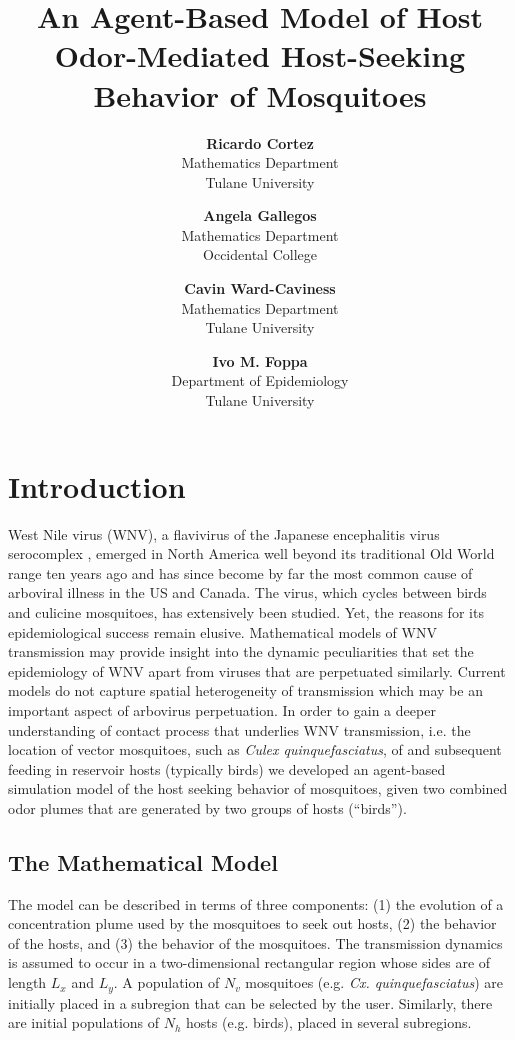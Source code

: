 \documentclass[11pt]{article}
\title{An Agent-Based Model of Host Odor-Mediated Host-Seeking Behavior of Mosquitoes}
\author{
\textbf{Ricardo Cortez}\\
   \small{Mathematics Department}\\
   \small{Tulane University}\\ \and
\textbf{Angela Gallegos}\\
   \small{Mathematics Department}\\
   \small{Occidental College}\\ \and
\textbf{Cavin Ward-Caviness}\\
   \small{Mathematics Department}\\
   \small{Tulane University}\\ \and
\textbf{Ivo M. Foppa}\\
   \small{Department of Epidemiology}\\
   \small{Tulane University}\\
}
\begin{document}
\maketitle

\renewcommand{\labelenumi}{(\alph{enumi})}
\section{Introduction}
West Nile virus (WNV), a flavivirus of the Japanese encephalitis virus serocomplex \cite{Petersen2001}, emerged in North America well beyond its traditional Old World range ten years ago and has since become by far the most common cause of arboviral illness in the US and Canada. The virus, which cycles between birds and culicine mosquitoes, has extensively been studied. Yet, the reasons for its epidemiological success remain elusive. Mathematical models of WNV transmission may provide insight into the dynamic peculiarities that set the epidemiology of WNV apart from viruses that are perpetuated similarly. Current models \cite{Wonham2006,Bowman2005} do  not capture spatial heterogeneity of transmission which may be an important aspect of arbovirus perpetuation. In order to gain a deeper understanding of contact process that underlies WNV transmission, i.e. the location of vector mosquitoes, such as {\it Culex quinquefasciatus}, of and subsequent feeding in reservoir hosts (typically birds) we developed an agent-based simulation model of the host seeking behavior of mosquitoes, given two combined odor plumes that are generated by two groups of hosts (``birds'').


\subsection{The Mathematical Model}
The model can be described in terms of three components: (1) the evolution of a concentration
plume used by the mosquitoes to seek out hosts, (2) the behavior of the hosts, and (3) the
behavior of the mosquitoes.  The transmission dynamics is assumed to occur in a two-dimensional
rectangular region whose sides are of length $L_x$ and $L_y$. A population of $N_v$ mosquitoes
(e.g. {\sl Cx. quinquefasciatus}) are initially placed in a subregion that can be selected by
the user. Similarly, there are initial populations of $N_h$ hosts (e.g. birds), placed in
several subregions.
\end{document}
